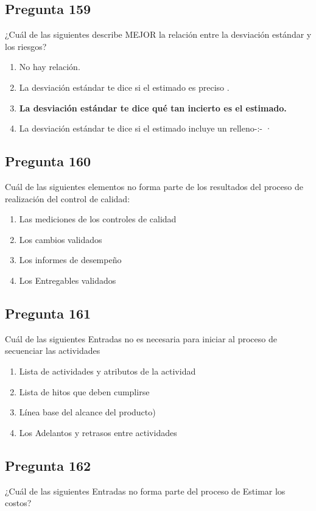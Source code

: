 \documentclass[11pt,a4paper]{article}
\begin{document}
\subsection*{Pregunta 159}
¿Cuál de las siguientes describe MEJOR la relación entre la desviación estándar y los riesgos?

\begin{enumerate}[label=\alph*)]
  \item No hay relación.
  \item La desviación estándar te dice si el estimado es preciso .
  \item \textbf{La desviación estándar te dice qué tan incierto es el estimado.}
  \item La desviación estándar te dice si el estimado incluye un relleno-:- ·
\end{enumerate}

\subsection*{Pregunta 160}
Cuál de las siguientes elementos no forma parte de los resultados del proceso de realización del control de calidad:

\begin{enumerate}[label=\alph*)]
  \item Las mediciones de los controles de calidad
  \item Los cambios validados
  \item Los informes de desempeño
  \item Los Entregables validados
\end{enumerate}

\subsection*{Pregunta 161}
Cuál de las siguientes Entradas no es necesaria para iniciar al proceso de secuenciar las actividades

\begin{enumerate}[label=\alph*)]
  \item Lista de actividades y atributos de la actividad
  \item Lista de hitos que deben cumplirse
  \item Línea base del alcance del producto)
  \item Los Adelantos y retrasos entre actividades
\end{enumerate}

\subsection*{Pregunta 162}
¿Cuál de las siguientes Entradas no forma parte del proceso de Estimar los costos?
\end{document}
